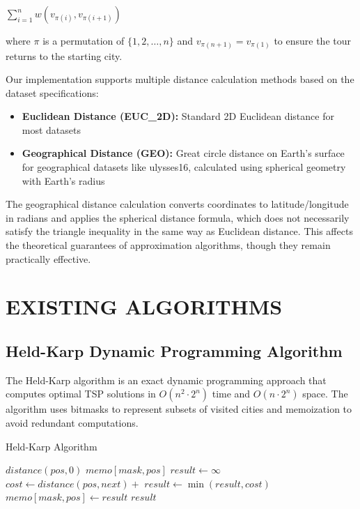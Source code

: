 \documentclass[sigconf]{acmart}
\begin{document}
$\sum_{i=1}^{n} w(v_{\pi(i)}, v_{\pi(i+1)})$

where $\pi$ is a permutation of $\{1, 2, \ldots, n\}$ and $v_{\pi(n+1)} = v_{\pi(1)}$ to ensure the tour returns to the starting city. 

Our implementation supports multiple distance calculation methods based on the dataset specifications:
\begin{itemize}
\item \textbf{Euclidean Distance (EUC\_2D):} Standard 2D Euclidean distance for most datasets
\item \textbf{Geographical Distance (GEO):} Great circle distance on Earth's surface for geographical datasets like ulysses16, calculated using spherical geometry with Earth's radius
\end{itemize}

The geographical distance calculation converts coordinates to latitude/longitude in radians and applies the spherical distance formula, which does not necessarily satisfy the triangle inequality in the same way as Euclidean distance. This affects the theoretical guarantees of approximation algorithms, though they remain practically effective.

\section{EXISTING ALGORITHMS}

\subsection{Held-Karp Dynamic Programming Algorithm}

The Held-Karp algorithm \cite{heldkarp_blog} is an exact dynamic programming approach that computes optimal TSP solutions in $O(n^2 \cdot 2^n)$ time and $O(n \cdot 2^n)$ space. The algorithm uses bitmasks to represent subsets of visited cities and memoization to avoid redundant computations.

\begin{algorithm}
\caption{Held-Karp Algorithm}
\begin{algorithmic}[1]
        \State \Return $distance(pos, 0)$
    \EndIf
        \State \Return $memo[mask, pos]$
    \EndIf
    \State $result \leftarrow \infty$
            \State $cost \leftarrow distance(pos, next) + $ 
            \State $result \leftarrow \min(result, cost)$
        \EndIf
    \EndFor
    \State $memo[mask, pos] \leftarrow result$
    \State \Return $result$
\EndFunction
\end{algorithmic}
\end{algorithm}
\end{document}
